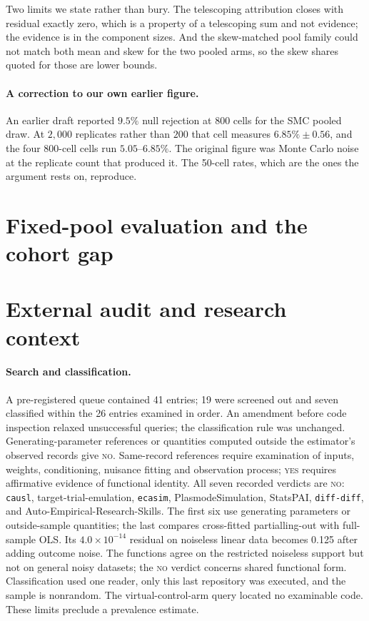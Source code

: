 Two limits we state rather than bury. The telescoping attribution closes with
residual exactly zero, which is a property of a telescoping sum and not
evidence; the evidence is in the component sizes. And the skew-matched pool
family could not match both mean and skew for the two pooled arms, so the skew
shares quoted for those are lower bounds.

\paragraph{A correction to our own earlier figure.} An earlier draft reported
$9.5\%$ null rejection at 800 cells for the SMC pooled draw. At $2{,}000$
replicates rather than $200$ that cell measures $6.85\% \pm 0.56$, and the four
800-cell cells run $5.05$--$6.85\%$. The original figure was Monte Carlo noise
at the replicate count that produced it. The 50-cell rates, which are the ones
the argument rests on, reproduce.

\section{Fixed-pool evaluation and the cohort gap}
\label{app:fixedpool}



\section{External audit and research context}
\label{app:prevalence}

\paragraph{Search and classification.}
A pre-registered queue contained 41 entries; 19 were screened out and seven
classified within the 26 entries examined in order. An amendment before code
inspection relaxed unsuccessful queries; the classification rule was unchanged.
Generating-parameter references or quantities computed outside the estimator's
observed records give \textsc{no}. Same-record references require examination
of inputs, weights, conditioning, nuisance fitting and observation process;
\textsc{yes} requires affirmative evidence of functional identity. All seven
recorded verdicts are \textsc{no}: \texttt{causl}, target-trial-emulation,
\texttt{ecasim}, PlasmodeSimulation, StatsPAI, \texttt{diff-diff}, and
Auto-Empirical-Research-Skills. The first six use generating parameters or
outside-sample quantities; the last compares cross-fitted partialling-out with
full-sample OLS. Its $4.0\times10^{-14}$ residual on noiseless linear data
becomes 0.125 after adding outcome noise. The functions agree on the restricted
noiseless support but not on general noisy datasets; the \textsc{no} verdict
concerns shared functional form. Classification used one reader, only this last
repository was executed, and the sample is nonrandom. The virtual-control-arm
query located no examinable code. These limits preclude a prevalence estimate.

